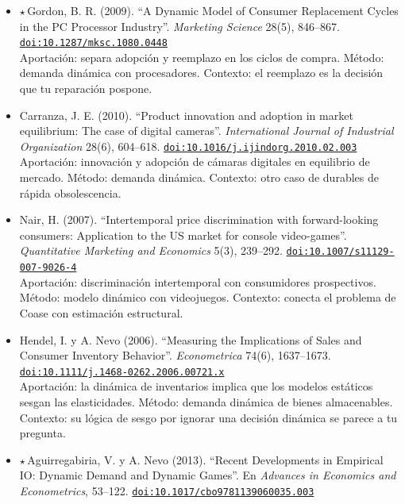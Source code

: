 \documentclass[11pt]{article}
\begin{document}
\begin{itemize}
Aportación: la compra de durables como paro óptimo con expectativas sobre calidad futura. Método: demanda dinámica con impresoras. Contexto: un antecedente de demanda dinámica agregada.
\item $\star$\,Gordon, B. R. (2009). ``A Dynamic Model of Consumer Replacement Cycles in the PC Processor Industry''. \textit{Marketing Science} 28(5), 846--867. \href{https://doi.org/10.1287/mksc.1080.0448}{\texttt{doi:10.1287/mksc.1080.0448}}\\
Aportación: separa adopción y reemplazo en los ciclos de compra. Método: demanda dinámica con procesadores. Contexto: el reemplazo es la decisión que tu reparación pospone.
\item Carranza, J. E. (2010). ``Product innovation and adoption in market equilibrium: The case of digital cameras''. \textit{International Journal of Industrial Organization} 28(6), 604--618. \href{https://doi.org/10.1016/j.ijindorg.2010.02.003}{\texttt{doi:10.1016/j.ijindorg.2010.02.003}}\\
Aportación: innovación y adopción de cámaras digitales en equilibrio de mercado. Método: demanda dinámica. Contexto: otro caso de durables de rápida obsolescencia.
\item Nair, H. (2007). ``Intertemporal price discrimination with forward-looking consumers: Application to the US market for console video-games''. \textit{Quantitative Marketing and Economics} 5(3), 239--292. \href{https://doi.org/10.1007/s11129-007-9026-4}{\texttt{doi:10.1007/s11129-007-9026-4}}\\
Aportación: discriminación intertemporal con consumidores prospectivos. Método: modelo dinámico con videojuegos. Contexto: conecta el problema de Coase con estimación estructural.
\item Hendel, I. y A. Nevo (2006). ``Measuring the Implications of Sales and Consumer Inventory Behavior''. \textit{Econometrica} 74(6), 1637--1673. \href{https://doi.org/10.1111/j.1468-0262.2006.00721.x}{\texttt{doi:10.1111/j.1468-0262.2006.00721.x}}\\
Aportación: la dinámica de inventarios implica que los modelos estáticos sesgan las elasticidades. Método: demanda dinámica de bienes almacenables. Contexto: su lógica de sesgo por ignorar una decisión dinámica se parece a tu pregunta.
\item $\star$\,Aguirregabiria, V. y A. Nevo (2013). ``Recent Developments in Empirical IO: Dynamic Demand and Dynamic Games''. En \textit{Advances in Economics and Econometrics}, 53--122. \href{https://doi.org/10.1017/cbo9781139060035.003}{\texttt{doi:10.1017/cbo9781139060035.003}}\\

\end{itemize}
\end{document}
